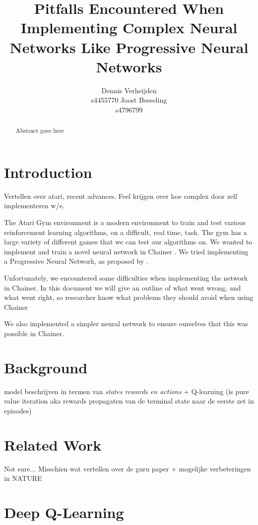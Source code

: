 \documentclass{article}
\title{Pitfalls Encountered When Implementing Complex Neural Networks Like Progressive Neural Networks}
\author{
  Dennis Verheijden\\
  s4455770
  \And
  Joost Besseling\\
  s4796799
}
\begin{document}

\maketitle

\begin{abstract}
  Abstract goes here
\end{abstract}

\section{Introduction}
Vertellen over atari, recent advances. Feel krijgen over hoe complex door zelf implementeren w/e.

The Atari Gym \cite{1606.01540} environment is a modern environment to train and test various reinforcement learning algorithms, on a difficult, real time, task. The gym has a large variety of different games that we can test our algorithms on. We wanted to implement and train a novel neural network in Chainer \cite{chainer_learningsys2015}. We tried implementing a Progressive Neural Network, as proposed by \cite{rusu2016progressive}. 

Unfortunately, we encountered some difficulties when implementing the network in Chainer. In this document we will give an outline of what went wrong, and what went right, so researcher know what problems they should avoid when using Chainer %

We also implemented a simpler neural network to ensure ourselves that this was possible in Chainer.

\section{Background}
model beschrijven in termen van \emph{states rewards en actions} + Q-learning (is pure value iteration aka rewards propagaten van de terminal state naar de eerste zet in episodes)

\section{Related Work}
Not sure... Misschien wat vertellen over de guru paper \cite{mnih2013playing} + mogelijke verbeteringen in NATURE \cite{mnih2015human}

\section{Deep Q-Learning}
\end{document}
